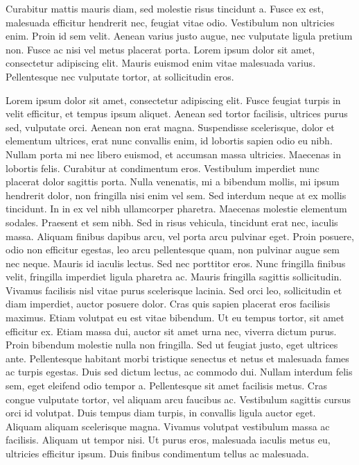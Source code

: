 \documentclass[twoside,a4paper]{article}
\begin{document}
\begin{triple}
Curabitur mattis mauris diam, sed molestie risus tincidunt a. Fusce ex est, malesuada efficitur hendrerit nec, feugiat vitae odio. Vestibulum non ultricies enim. Proin id sem velit. Aenean varius justo augue, nec vulputate ligula pretium non. Fusce ac nisi vel metus placerat porta. Lorem ipsum dolor sit amet, consectetur adipiscing elit. Mauris euismod enim vitae malesuada varius. Pellentesque nec vulputate tortor, at sollicitudin eros.
\end{triple}

\begin{double}
Lorem ipsum dolor sit amet, consectetur adipiscing elit. Fusce feugiat turpis in velit efficitur, et tempus ipsum aliquet. Aenean sed tortor facilisis, ultrices purus sed, vulputate orci. Aenean non erat magna. Suspendisse scelerisque, dolor et elementum ultrices, erat nunc convallis enim, id lobortis sapien odio eu nibh. Nullam porta mi nec libero euismod, et accumsan massa ultricies. Maecenas in lobortis felis. Curabitur at condimentum eros. Vestibulum imperdiet nunc placerat dolor sagittis porta. Nulla venenatis, mi a bibendum mollis, mi ipsum hendrerit dolor, non fringilla nisi enim vel sem. Sed interdum neque at ex mollis tincidunt. In in ex vel nibh ullamcorper pharetra. Maecenas molestie elementum sodales. Praesent et sem nibh. Sed in risus vehicula, tincidunt erat nec, iaculis massa. Aliquam finibus dapibus arcu, vel porta arcu pulvinar eget. Proin posuere, odio non efficitur egestas, leo arcu pellentesque quam, non pulvinar augue sem nec neque.
Mauris id iaculis lectus. Sed nec porttitor eros. Nunc fringilla finibus velit, fringilla imperdiet ligula pharetra ac. Mauris fringilla sagittis sollicitudin. Vivamus facilisis nisl vitae purus scelerisque lacinia. Sed orci leo, sollicitudin et diam imperdiet, auctor posuere dolor. Cras quis sapien placerat eros facilisis maximus. Etiam volutpat eu est vitae bibendum. Ut eu tempus tortor, sit amet efficitur ex. Etiam massa dui, auctor sit amet urna nec, viverra dictum purus. Proin bibendum molestie nulla non fringilla. Sed ut feugiat justo, eget ultrices ante. Pellentesque habitant morbi tristique senectus et netus et malesuada fames ac turpis egestas.
Duis sed dictum lectus, ac commodo dui. Nullam interdum felis sem, eget eleifend odio tempor a. Pellentesque sit amet facilisis metus. Cras congue vulputate tortor, vel aliquam arcu faucibus ac. Vestibulum sagittis cursus orci id volutpat. Duis tempus diam turpis, in convallis ligula auctor eget. Aliquam aliquam scelerisque magna. Vivamus volutpat vestibulum massa ac facilisis. Aliquam ut tempor nisi. Ut purus eros, malesuada iaculis metus eu, ultricies efficitur ipsum. Duis finibus condimentum tellus ac malesuada.

\end{double}
\end{document}
